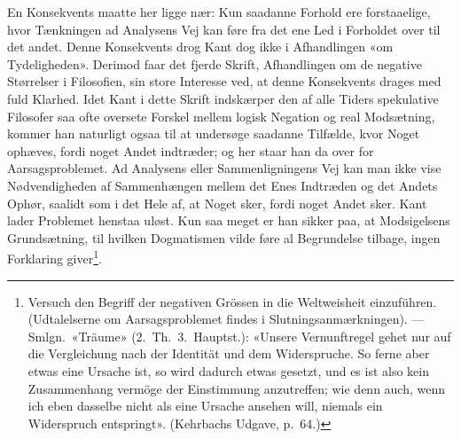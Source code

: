 \documentclass[12pt,a4paper]{article}
\newcommand{\apage}[1]{\marginnote{\footnotesize\textit{[#1]}}}
\begin{document}
En Konsekvents maatte her ligge nær: Kun saadanne Forhold ere
forstaaelige, hvor Tænkningen ad Analysens Vej kan føre fra det ene Led i
Forholdet over til det andet. Denne Konsekvents drog Kant dog ikke i
Afhandlingen «om Tydeligheden». Derimod faar det fjerde Skrift,
Afhandlingen om de negative Størrelser i Filosofien, sin store Interesse
ved, at denne Konsekvents drages med fuld Klarhed. Idet Kant i dette
Skrift \apage{20}  indskærper den af alle Tiders spekulative Filosofer saa ofte
oversete Forskel mellem logisk Negation og real Modsætning, kommer han
naturligt ogsaa til at undersøge saadanne Tilfælde, kvor Noget ophæves,
fordi noget Andet indtræder; og her staar han da over for
Aarsagsproblemet. Ad Analysens eller Sammenligningens Vej kan man ikke
vise Nødvendigheden af Sammenhængen mellem det Enes Indtræden og det
Andets Ophør, saalidt som i det Hele af, at Noget sker, fordi noget Andet
sker. Kant lader Problemet henstaa uløst. Kun saa meget er han sikker
paa, at Modsigelsens Grundsætning, til hvilken Dogmatismen vilde føre al
Begrundelse tilbage, ingen Forklaring
giver\footnote{Versuch den Begriff der negativen Grössen in die
Weltweisheit einzuführen. (Udtalelserne om Aarsagsproblemet findes i
Slutningsanmærkningen). --- Smlgn.\ «Träume» (2.\ Th.\ 3.\ Hauptst.):
«Unsere Vernunftregel gehet nur auf die Vergleichung nach der Identität
und dem Widerspruche. So ferne aber etwas eine Ursache ist, so wird
dadurch etwas gesetzt, und es ist also kein Zusammenhang vermöge der
Einstimmung anzutreffen; wie denn auch, wenn ich eben dasselbe nicht als
eine Ursache ansehen will, niemals ein Widerspruch entspringt».
(Kehrbachs Udgave, p.\ 64.)}.
\end{document}
